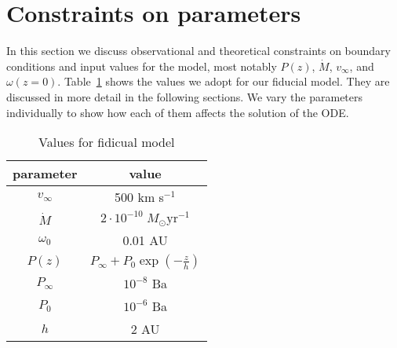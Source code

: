 \section{Constraints on parameters}
\label{sect:parameters}
In this section we discuss observational and theoretical constraints on boundary conditions and input values for the model, most notably $P(z)$, $\dot M$, $v_\infty$, and $\omega(z=0)$. Table~\ref{tab:fiducial} shows the values we adopt for our fiducial model. They are discussed in more detail in the following sections. We vary the parameters individually to show how each of them affects the solution of the ODE. 
\begin{table}
\label{tab:fiducial}
\caption{Values for fidicual model}
\begin{tabular}{cc}
\hline\hline
parameter & value\\
\hline
$v_\infty$ & 500 km s$^{-1}$\\
$\dot M$ & $2\cdot10^{-10}\;M_\odot\textrm{yr}^{-1}$\\
$\omega_0$ & 0.01 AU\\
$P(z)$ & $P_\infty+P_0\exp\left(-\frac{z}{h}\right)$\\
$P_\infty$ & $10^{-8}$ Ba\\
$P_0$ & $10^{-6}$ Ba\\
$h$ & 2 AU\\
\hline
\end{tabular}
\end{table}